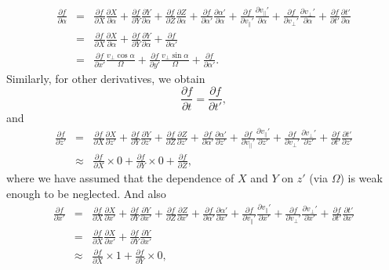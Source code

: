 \documentclass{llncs}
\begin{document}
\begin{eqnarray}
  \frac{\partial f}{\partial \alpha} & = & \frac{\partial f}{\partial X}
  \frac{\partial X}{\partial \alpha} + \frac{\partial f}{\partial Y}
  \frac{\partial Y}{\partial \alpha} + \frac{\partial f}{\partial Z}
  \frac{\partial Z}{\partial \alpha} + \frac{\partial f}{\partial \alpha'}
  \frac{\partial \alpha'}{\partial \alpha} + \frac{\partial f}{\partial
  v_{\parallel}'} \frac{\partial v_{\parallel}'}{\partial \alpha} +
  \frac{\partial f}{\partial v_{\perp}'} \frac{\partial v_{\perp}'}{\partial
  \alpha} + \frac{\partial f}{\partial t'} \frac{\partial t'}{\partial \alpha}
  \nonumber\\
  & = & \frac{\partial f}{\partial X} \frac{\partial X}{\partial \alpha} +
  \frac{\partial f}{\partial Y} \frac{\partial Y}{\partial \alpha} +
  \frac{\partial f}{\partial \alpha'} \nonumber\\
  & = & \frac{\partial f}{\partial x'} \frac{v_{\perp} \cos \alpha}{\Omega} +
  \frac{\partial f}{\partial y'} \frac{v_{\perp} \sin \alpha}{\Omega} +
  \frac{\partial f}{\partial \alpha'} . 
\end{eqnarray}
Similarly, for other derivatives, we obtain
\begin{equation}
  \frac{\partial f}{\partial t} = \frac{\partial f}{\partial t'},
\end{equation}
and
\begin{eqnarray}
  \frac{\partial f}{\partial z'} & = & \frac{\partial f}{\partial X}
  \frac{\partial X}{\partial z'} + \frac{\partial f}{\partial Y}
  \frac{\partial Y}{\partial z'} + \frac{\partial f}{\partial Z}
  \frac{\partial Z}{\partial z'} + \frac{\partial f}{\partial \alpha'}
  \frac{\partial \alpha'}{\partial z'} + \frac{\partial f}{\partial
  v_{\parallel}'} \frac{\partial v_{\parallel}'}{\partial z'} + \frac{\partial
  f}{\partial v_{\perp}'} \frac{\partial v_{\perp}'}{\partial z'} +
  \frac{\partial f}{\partial t'} \frac{\partial t'}{\partial z'} \nonumber\\
  & \approx & \frac{\partial f}{\partial X} \times 0 + \frac{\partial
  f}{\partial Y} \times 0 + \frac{\partial f}{\partial Z}, 
\end{eqnarray}
where we have assumed that the dependence of $X$ and $Y$ on $z'$ (via
$\Omega$) is weak enough to be neglected. And also
\begin{eqnarray}
  \frac{\partial f}{\partial x'} & = & \frac{\partial f}{\partial X}
  \frac{\partial X}{\partial x'} + \frac{\partial f}{\partial Y}
  \frac{\partial Y}{\partial x'} + \frac{\partial f}{\partial Z}
  \frac{\partial Z}{\partial x'} + \frac{\partial f}{\partial \alpha'}
  \frac{\partial \alpha'}{\partial x'} + \frac{\partial f}{\partial
  v_{\parallel}'} \frac{\partial v_{\parallel}'}{\partial x'} + \frac{\partial
  f}{\partial v_{\perp}'} \frac{\partial v_{\perp}'}{\partial x'} +
  \frac{\partial f}{\partial t'} \frac{\partial t'}{\partial x'} \nonumber\\
  & = & \frac{\partial f}{\partial X} \frac{\partial X}{\partial x'} +
  \frac{\partial f}{\partial Y} \frac{\partial Y}{\partial x'} \nonumber\\
  & \approx & \frac{\partial f}{\partial X} \times 1 + \frac{\partial
  f}{\partial Y} \times 0, 
\end{eqnarray}
\end{document}
